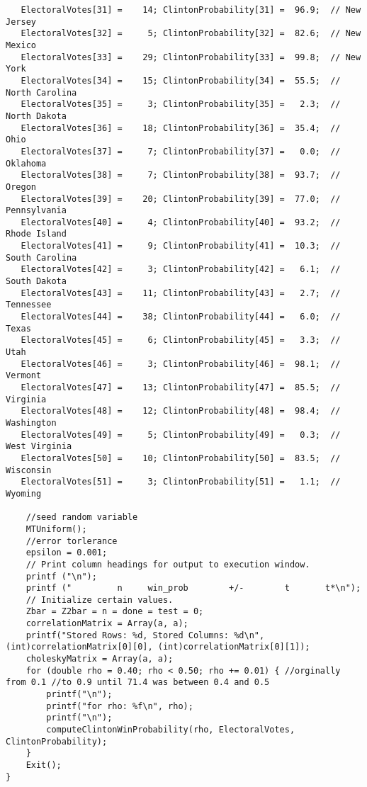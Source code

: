 \documentclass{report}
\begin{document}
\begin{lstlisting}
   ElectoralVotes[31] =    14; ClintonProbability[31] =  96.9;  // New Jersey
   ElectoralVotes[32] =     5; ClintonProbability[32] =  82.6;  // New Mexico
   ElectoralVotes[33] =    29; ClintonProbability[33] =  99.8;  // New York
   ElectoralVotes[34] =    15; ClintonProbability[34] =  55.5;  // North Carolina
   ElectoralVotes[35] =     3; ClintonProbability[35] =   2.3;  // North Dakota
   ElectoralVotes[36] =    18; ClintonProbability[36] =  35.4;  // Ohio
   ElectoralVotes[37] =     7; ClintonProbability[37] =   0.0;  // Oklahoma
   ElectoralVotes[38] =     7; ClintonProbability[38] =  93.7;  // Oregon
   ElectoralVotes[39] =    20; ClintonProbability[39] =  77.0;  // Pennsylvania
   ElectoralVotes[40] =     4; ClintonProbability[40] =  93.2;  // Rhode Island
   ElectoralVotes[41] =     9; ClintonProbability[41] =  10.3;  // South Carolina
   ElectoralVotes[42] =     3; ClintonProbability[42] =   6.1;  // South Dakota
   ElectoralVotes[43] =    11; ClintonProbability[43] =   2.7;  // Tennessee
   ElectoralVotes[44] =    38; ClintonProbability[44] =   6.0;  // Texas
   ElectoralVotes[45] =     6; ClintonProbability[45] =   3.3;  // Utah
   ElectoralVotes[46] =     3; ClintonProbability[46] =  98.1;  // Vermont
   ElectoralVotes[47] =    13; ClintonProbability[47] =  85.5;  // Virginia
   ElectoralVotes[48] =    12; ClintonProbability[48] =  98.4;  // Washington
   ElectoralVotes[49] =     5; ClintonProbability[49] =   0.3;  // West Virginia
   ElectoralVotes[50] =    10; ClintonProbability[50] =  83.5;  // Wisconsin
   ElectoralVotes[51] =     3; ClintonProbability[51] =   1.1;  // Wyoming

    //seed random variable
    MTUniform();
    //error torlerance
    epsilon = 0.001;
    // Print column headings for output to execution window.
    printf ("\n");
    printf ("         n     win_prob        +/-        t       t*\n");
    // Initialize certain values.
    Zbar = Z2bar = n = done = test = 0;
    correlationMatrix = Array(a, a);
    printf("Stored Rows: %d, Stored Columns: %d\n", (int)correlationMatrix[0][0], (int)correlationMatrix[0][1]);
    choleskyMatrix = Array(a, a);
    for (double rho = 0.40; rho < 0.50; rho += 0.01) { //orginally from 0.1 //to 0.9 until 71.4 was between 0.4 and 0.5
        printf("\n");
        printf("for rho: %f\n", rho);
        printf("\n");
        computeClintonWinProbability(rho, ElectoralVotes, ClintonProbability);
    }
    Exit();
}
\end{lstlisting}
\pagebreak
\end{document}
